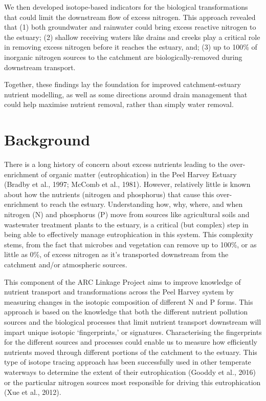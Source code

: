 \documentclass[
]{book}
\begin{document}
We then developed isotope-based indicators for the biological transformations that could limit the downstream flow of excess nitrogen. This approach revealed that (1) both groundwater and rainwater could bring excess reactive nitrogen to the estuary; (2) shallow receiving waters like drains and creeks play a critical role in removing excess nitrogen before it reaches the estuary, and; (3) up to 100\% of inorganic nitrogen sources to the catchment are biologically-removed during downstream transport.

Together, these findings lay the foundation for improved catchment-estuary nutrient modelling, as well as some directions around drain management that could help maximise nutrient removal, rather than simply water removal.

\hypertarget{background-4}{%
\section{Background}\label{background-4}}

There is a long history of concern about excess nutrients leading to the over-enrichment of organic matter (eutrophication) in the Peel Harvey Estuary (Bradby et al., 1997; McComb et al., 1981). However, relatively little is known about how the nutrients (nitrogen and phosphorus) that cause this over-enrichment to reach the estuary. Understanding how, why, where, and when nitrogen (N) and phosphorus (P) move from sources like agricultural soils and wastewater treatment plants to the estuary, is a critical (but complex) step in being able to effectively manage eutrophication in this system. This complexity stems, from the fact that microbes and vegetation can remove up to 100\%, or as little as 0\%, of excess nitrogen as it's transported downstream from the catchment and/or atmospheric sources.

This component of the ARC Linkage Project aims to improve knowledge of nutrient transport and transformations across the Peel Harvey system by measuring changes in the isotopic composition of different N and P forms. This approach is based on the knowledge that both the different nutrient pollution sources and the biological processes that limit nutrient transport downstream will impart unique isotopic `fingerprints,' or signatures. Characterising the fingerprints for the different sources and processes could enable us to measure how efficiently nutrients moved through different portions of the catchment to the estuary. This type of isotope tracing approach has been successfully used in other temperate waterways to determine the extent of their eutrophication (Gooddy et al., 2016) or the particular nitrogen sources most responsible for driving this eutrophication (Xue et al., 2012).
\end{document}
